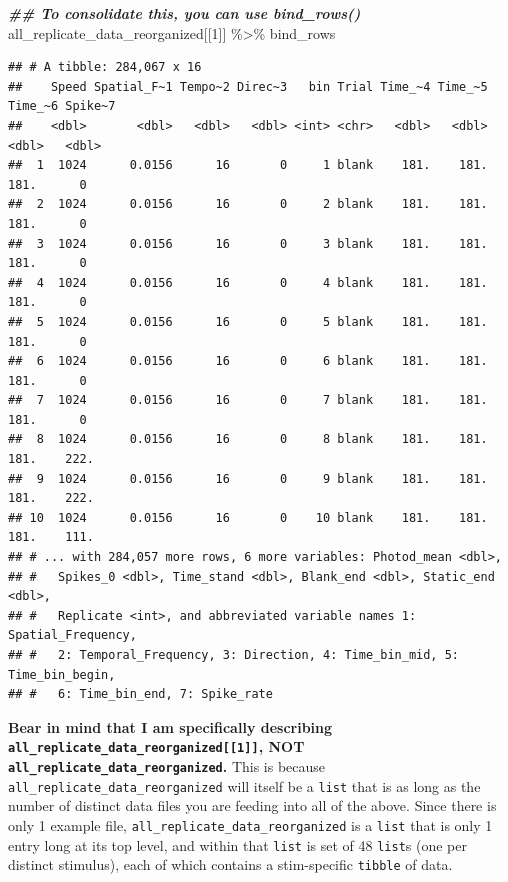 \documentclass[
]{book}
\newenvironment{Shaded}{\begin{snugshade}}{\end{snugshade}}
\newcommand{\DecValTok}[1]{\textcolor[rgb]{0.00,0.00,0.81}{#1}}
\newcommand{\DocumentationTok}[1]{\textcolor[rgb]{0.56,0.35,0.01}{\textbf{\textit{#1}}}}
\newcommand{\NormalTok}[1]{#1}
\newcommand{\SpecialCharTok}[1]{\textcolor[rgb]{0.00,0.00,0.00}{#1}}
\begin{document}
\begin{Shaded}
\begin{Highlighting}[]
\DocumentationTok{\#\# To consolidate this, you can use bind\_rows()}
\NormalTok{all\_replicate\_data\_reorganized[[}\DecValTok{1}\NormalTok{]] }\SpecialCharTok{\%\textgreater{}\%}\NormalTok{ bind\_rows}
\end{Highlighting}
\end{Shaded}

\begin{verbatim}
## # A tibble: 284,067 x 16
##    Speed Spatial_F~1 Tempo~2 Direc~3   bin Trial Time_~4 Time_~5 Time_~6 Spike~7
##    <dbl>       <dbl>   <dbl>   <dbl> <int> <chr>   <dbl>   <dbl>   <dbl>   <dbl>
##  1  1024      0.0156      16       0     1 blank    181.    181.    181.      0 
##  2  1024      0.0156      16       0     2 blank    181.    181.    181.      0 
##  3  1024      0.0156      16       0     3 blank    181.    181.    181.      0 
##  4  1024      0.0156      16       0     4 blank    181.    181.    181.      0 
##  5  1024      0.0156      16       0     5 blank    181.    181.    181.      0 
##  6  1024      0.0156      16       0     6 blank    181.    181.    181.      0 
##  7  1024      0.0156      16       0     7 blank    181.    181.    181.      0 
##  8  1024      0.0156      16       0     8 blank    181.    181.    181.    222.
##  9  1024      0.0156      16       0     9 blank    181.    181.    181.    222.
## 10  1024      0.0156      16       0    10 blank    181.    181.    181.    111.
## # ... with 284,057 more rows, 6 more variables: Photod_mean <dbl>,
## #   Spikes_0 <dbl>, Time_stand <dbl>, Blank_end <dbl>, Static_end <dbl>,
## #   Replicate <int>, and abbreviated variable names 1: Spatial_Frequency,
## #   2: Temporal_Frequency, 3: Direction, 4: Time_bin_mid, 5: Time_bin_begin,
## #   6: Time_bin_end, 7: Spike_rate
\end{verbatim}

\textbf{Bear in mind that I am specifically describing
\texttt{all\_replicate\_data\_reorganized{[}{[}1{]}{]}}, NOT \texttt{all\_replicate\_data\_reorganized}.}
This is because \texttt{all\_replicate\_data\_reorganized} will itself be a \texttt{list} that is
as long as the number of distinct data files you are feeding into all of the
above. Since there is only 1 example file, \texttt{all\_replicate\_data\_reorganized} is a
\texttt{list} that is only 1 entry long at its top level, and within that \texttt{list} is set
of 48 \texttt{list}s (one per distinct stimulus), each of which contains a
stim-specific \texttt{tibble} of data.
\end{document}
